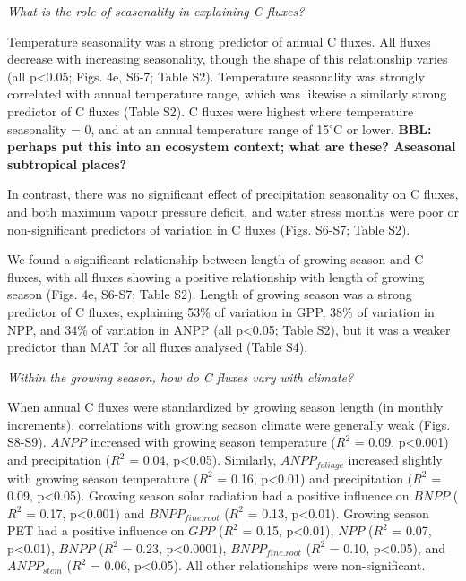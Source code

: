 \documentclass[
]{article}
\begin{document}
\emph{What is the role of seasonality in explaining C fluxes?}

Temperature seasonality was a strong predictor of annual C fluxes. All
fluxes decrease with increasing seasonality, though the shape of this
relationship varies (all p\textless0.05; Figs. 4e, S6-7; Table S2).
Temperature seasonality was strongly correlated with annual temperature
range, which was likewise a similarly strong predictor of C fluxes
(Table S2). C fluxes were highest where temperature seasonality = 0, and
at an annual temperature range of 15\(^\circ\)C or lower. \textbf{BBL:
perhaps put this into an ecosystem context; what are these? Aseasonal
subtropical places?}

In contrast, there was no significant effect of precipitation
seasonality on C fluxes, and both maximum vapour pressure deficit, and
water stress months were poor or non-significant predictors of variation
in C fluxes (Figs. S6-S7; Table S2).

We found a significant relationship between length of growing season and
C fluxes, with all fluxes showing a positive relationship with length of
growing season (Figs. 4e, S6-S7; Table S2). Length of growing season was
a strong predictor of C fluxes, explaining 53\% of variation in GPP,
38\% of variation in NPP, and 34\% of variation in ANPP (all
p\textless0.05; Table S2), but it was a weaker predictor than MAT for
all fluxes analysed (Table S4).

\emph{Within the growing season, how do C fluxes vary with climate?}

When annual C fluxes were standardized by growing season length (in
monthly increments), correlations with growing season climate were
generally weak (Figs. S8-S9). \(ANPP\) increased with growing season
temperature (\(R^2\) = 0.09, p\textless0.001) and precipitation (\(R^2\)
= 0.04, p\textless0.05). Similarly, \(ANPP_{foliage}\) increased
slightly with growing season temperature (\(R^2\) = 0.16,
p\textless0.01) and precipitation (\(R^2\) = 0.09, p\textless0.05).
Growing season solar radiation had a positive influence on \(BNPP\)
(\(R^2\) = 0.17, p\textless0.001) and \(BNPP_{fine.root}\) (\(R^2\) =
0.13, p\textless0.01). Growing season PET had a positive influence on
\(GPP\) (\(R^2\) = 0.15, p\textless0.01), \(NPP\) (\(R^2\) = 0.07,
p\textless0.01), \(BNPP\) (\(R^2\) = 0.23, p\textless0.0001),
\(BNPP_{fine.root}\) (\(R^2\) = 0.10, p\textless0.05), and
\(ANPP_{stem}\) (\(R^2\) = 0.06, p\textless0.05). All other
relationships were non-significant.
\end{document}
